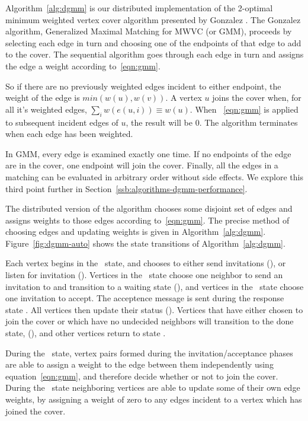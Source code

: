 Algorithm~\ref{alg:dgmm} is our distributed implementation of the 2-optimal minimum weighted vertex cover algorithm presented by Gonzalez \cite{Gonzalez1995129}. The Gonzalez algorithm, Generalized Maximal Matching for MWVC (or GMM), proceeds by selecting each edge in turn and choosing one of the endpoints of that edge to add to the cover. The sequential algorithm goes through each edge in turn and assigns the edge a weight according to~\eqref{eqn:gmm}.



So if there are no previously weighted edges incident to either endpoint, the weight of the edge is $min(w(u),w(v))$. A vertex $u$ joins the cover when, for all it's weighted edges, $\sum_i w(e(u,i)) \equiv w(u)$. When ~\eqref{eqn:gmm} is applied to subsequent incident edges of $u$, the result will be 0. The algorithm terminates when each edge has been weighted. 

In GMM, every edge is examined exactly one time. If no endpoints of the edge are in the cover, one endpoint will join the cover. Finally, all the edges in a matching can be evaluated in arbitrary order without side effects. We explore this third point further in Section~\ref{ssb:algorithms-dgmm-performance}. 

The distributed version of the algorithm chooses some disjoint set of edges and assigns weights to those edges according to~\eqref{eqn:gmm}. The precise method of choosing edges and updating weights is given in Algorithm~\ref{alg:dgmm}. Figure~\ref{fig:dgmm-auto} shows the state transitions of Algorithm~\ref{alg:dgmm}. 



Each vertex begins in the \cCd\ state, and chooses to either send invitations (\cId), or listen for invitation (\cLd). Vertices in the \cId\ state choose one neighbor to send an invitation to and transition to a waiting state (\cWd), and vertices in the \cLd\ state choose one invitation to accept. The acceptence message is sent during the response state \cRd. All vertices then update their status (\cUd). Vertices that have either chosen to join the cover or which have no undecided neighbors will transition to the done state, (\cDd), and other vertices return to state \cCd.  


During the \cUd\ state, vertex pairs formed during the invitation/acceptance phases are able to assign a weight to the edge between them independently using equation~\ref{eqn:gmm}, and therefore decide whether or not to join the cover. During the \cEd\ state neighboring vertices are able to update some of their own edge weights, by assigning a weight of zero to any edges incident to a vertex which has joined the cover.


